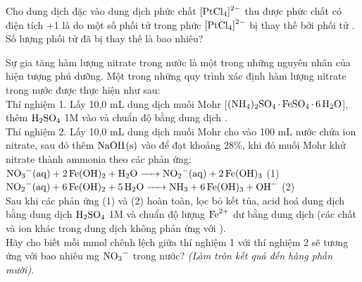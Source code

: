 \documentclass[11pt,a4paper]{article}
\begin{document}
\begin{ex}
 Cho dung dịch  đặc vào dung dịch phức chất $\ce{[PtCl4]^2-}$ thu được phức chất có điện tích +1 là do một số phối tử  trong phức $\ce{[PtCl4]^2-}$ bị thay thế bởi phối tử . Số lượng phối tử  đã bị thay thế là bao nhiêu?
\end{ex}


\begin{ex}
Sự gia tăng hàm lượng nitrate trong nước là một trong những nguyên nhân của hiện tượng phú dưỡng. Một trong những quy trình xác định hàm lượng nitrate trong nước được thực hiện như sau:\\
Thí nghiệm 1. Lấy 10,0 mL dung dịch muối Mohr [$\ce{(NH4)2SO4.FeSO4.6H2O}$], thêm $\ce{H2SO4}$ 1M vào và chuẩn độ bằng dung dịch .\\
Thí nghiệm 2. Lấy 10,0 mL dung dịch muối Mohr cho vào 100 mL nước chứa ion nitrate, sau đó thêm $\ce{NaOH(s)}$ vào để đạt khoảng 28\%, khi đó muối Mohr khử nitrate thành ammonia theo các phản ứng:\\
$\ce{NO3-(aq) + 2Fe(OH)2 + H2O -> NO2-(aq) + 2Fe(OH)3}$ (1)\\
$\ce{NO2-(aq) + 6Fe(OH)2 + 5H2O -> NH3 + 6Fe(OH)3 + OH-}$ (2)\\
Sau khi các phản ứng (1) và (2) hoàn toàn, lọc bỏ kết tủa, acid hoá dung dịch bằng dung dịch $\ce{H2SO4}$ 1M và chuẩn độ lượng $\ce{Fe^2+}$ dư bằng dung dịch  (các chất và ion khác trong dung dịch không phản ứng với ).\\
Hãy cho biết mỗi mmol  chênh lệch giữa thí nghiệm 1 với thí nghiệm 2 sẽ tương ứng với bao nhiêu mg $\ce{NO3-}$ trong nước? \textit{(Làm tròn kết quả đến hàng phần mười)}.
\end{ex}
\end{document}
